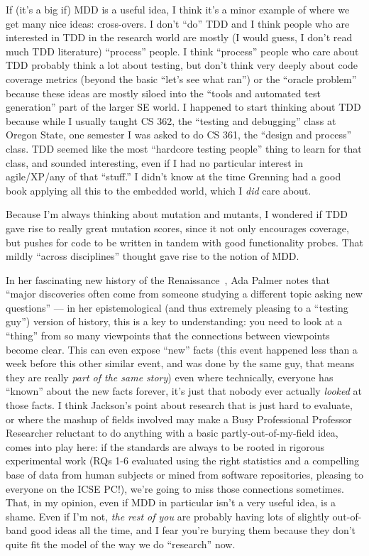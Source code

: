 \documentclass[sigplan,screen]{acmart}
\begin{document}
If (it's a big if) MDD is a useful idea, I think it's a minor example
of where we get many nice ideas:  cross-overs.  I don't ``do'' TDD and
I think people who are interested in TDD in the research world are
mostly (I would guess, I don't read much TDD literature) ``process''
people.  I think ``process'' people who care about TDD probably think
a lot about testing, but don't think very deeply about code coverage
metrics (beyond the basic ``let's see what ran'') or the ``oracle
problem'' because these ideas are mostly siloed into the ``tools and
automated test generation'' part of the larger SE world.  I happened
to start thinking about TDD because while I usually taught CS 362, the
``testing and debugging'' class at Oregon State, one semester I was
asked to do CS 361, the ``design and process'' class.  TDD seemed like
the most ``hardcore testing people'' thing to learn for that class,
and sounded interesting, even if I had no particular interest in
agile/XP/any of that ``stuff.''  I didn't know at the time Grenning
had a good book applying all this to the embedded world, which I
\emph{did} care about.

Because I'm always thinking about mutation and mutants, I wondered if
TDD gave rise to really great mutation scores, since it not only
encourages coverage, but pushes for code to be written in tandem with
good functionality probes.  That mildly ``across disciplines'' thought
gave rise to the notion of MDD.

In her fascinating new history of the Renaissance~\cite{palmer}, Ada
Palmer notes that ``major discoveries often come from someone studying
a different topic asking new questions'' --- in her epistemological
(and thus extremely pleasing to a ``testing guy'') version of history,
this is a key to understanding:  you need to look at a ``thing'' from so many
viewpoints that the connections between viewpoints become clear.  This
can even expose ``new''
facts (this event happened less than a week before
this other similar event, and was done by the same guy, that means
they are really \emph{part of the same story}) even where technically,
everyone has ``known'' about the new facts forever, it's just that
nobody ever actually \emph{looked} at those facts.  I think Jackson's
point about research that is just hard to evaluate, or where the mashup of fields
involved may make a Busy Professional Professor Researcher reluctant
to do anything with a basic partly-out-of-my-field idea, comes into play here:  if the standards are
always to be rooted in rigorous experimental work (RQs 1-6 evaluated
using the right statistics and a compelling base of data from human
subjects or mined from software repositories, pleasing to everyone on
the ICSE PC!), we're going to miss those connections sometimes.
That, in my opinion, even if MDD in particular isn't a very useful
idea, is a shame.  Even if I'm not, \emph{the rest of you} are probably having lots of
slightly out-of-band good ideas all the time, and I fear you're
burying them because they don't quite fit the model of the way we do
``research'' now.



\end{document}
